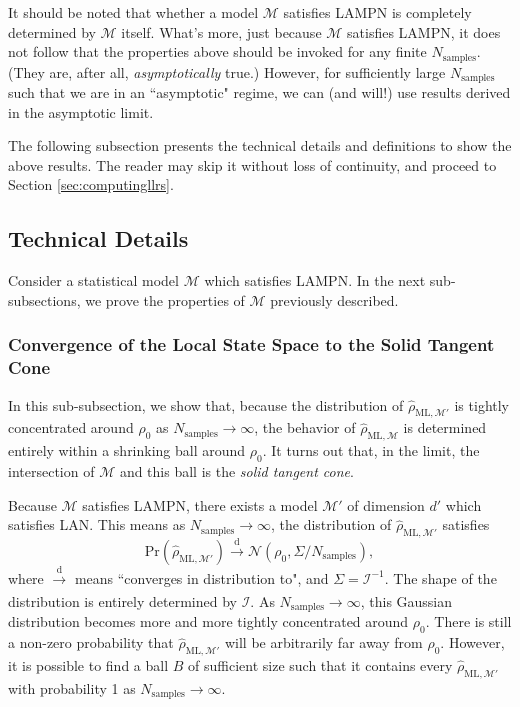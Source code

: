 \documentclass[aps,pra, twocolumn]{revtex4-1}
\newcommand{\M}{\mathcal{M}}
\newcommand{\rhohat}{\hat{\rho}}
\newcommand{\rhoML}[1]{\rhohat_{\scriptscriptstyle{\mathrm{ML},#1}}}
\begin{document}
It should be noted that whether a model $\M$ satisfies LAMPN is completely determined by $\M$ itself. What's more, just because $\M$ satisfies LAMPN, it does not follow that the properties above should be invoked for any finite $N_{\mathrm{samples}}$. (They are, after all, \emph{asymptotically} true.) However, for sufficiently large $N_{\mathrm{samples}}$ such that we are in an ``asymptotic" regime, we can (and will!) use results derived in the asymptotic limit.

The following subsection presents the technical details and definitions to show the above results. The reader may skip it without loss of continuity, and proceed to Section \ref{sec:computingllrs}.

\subsection{Technical Details}

Consider a statistical model $\M$ which satisfies LAMPN. In the next sub-subsections, we prove the properties of $\M$ previously described.

\subsubsection{Convergence of the Local State Space to the Solid Tangent Cone}

In this sub-subsection, we show that, because the distribution of $\rhoML{\M'}$ is tightly concentrated around $\rho_{0}$ as $N_{\mathrm{samples}} \rightarrow \infty$, the behavior of $\rhoML{\M}$ is determined entirely within a shrinking ball around $\rho_{0}$. It turns out that, in the limit, the intersection of $\M$ and this ball is the \emph{solid tangent cone}.

Because $\M$ satisfies LAMPN, there exists a model $\M'$ of dimension $d'$ which satisfies LAN. This means as $N_{\mathrm{samples}} \rightarrow \infty$, the distribution of $\rhoML{\M'}$ satisfies
\[\mathrm{Pr}(\rhoML{\M'})\xrightarrow[]{\text{d}} \mathcal{N}(\rho_{0}, \Sigma/N_{\mathrm{samples}}),\]
where $\xrightarrow[]{\text{d}}$ means ``converges in distribution to", and $\Sigma = \mathcal{I}^{-1}$.
The shape of the distribution is entirely determined by $\mathcal{I}$. As $N_{\mathrm{samples}} \rightarrow \infty$, this Gaussian distribution becomes more and more tightly concentrated around $\rho_{0}$. There is still a non-zero probability that $\rhoML{\M'}$ will be arbitrarily far away from $\rho_{0}$. However, it is possible to find a ball $B$ of sufficient size such that it contains every $\rhoML{\M'}$ with probability 1 as $N_{\mathrm{samples}}\rightarrow \infty$.
\end{document}
